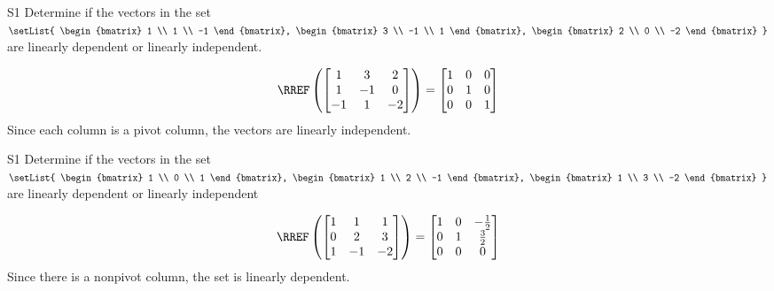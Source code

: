 \begin{problem}{S1}
Determine if the vectors in the set
\(\setList{
  \begin{bmatrix} 1 \\ 1 \\ -1 \end{bmatrix},
  \begin{bmatrix} 3 \\ -1 \\ 1 \end{bmatrix},
  \begin{bmatrix} 2 \\ 0 \\ -2 \end{bmatrix}
}\)
are linearly dependent or linearly independent.
\end{problem}
\begin{solution}
\[
  \RREF\left(
    \begin{bmatrix} 1 & 3 & 2 \\ 1 & -1 & 0 \\ -1 & 1 & -2 \end{bmatrix}
  \right)
    =
  \begin{bmatrix} 1 & 0 &0 \\ 0 & 1 & 0 \\ 0 & 0 & 1\end{bmatrix}
\]
Since each column is a pivot column, the vectors are linearly independent.
\end{solution}


\begin{problem}{S1}
Determine if the vectors in the set
\(
  \setList{
    \begin{bmatrix} 1 \\ 0 \\ 1 \end{bmatrix},
    \begin{bmatrix} 1 \\ 2 \\ -1 \end{bmatrix},
    \begin{bmatrix} 1 \\ 3 \\ -2 \end{bmatrix}
  }
\)
are linearly dependent or linearly independent
\end{problem}
\begin{solution}
\[
  \RREF\left(
    \begin{bmatrix} 1 &  1 & 1 \\ 0  & 2 & 3 \\ 1  & -1 & -2 \end{bmatrix}
  \right)
    =
  \begin{bmatrix} 1 &  0 & -\frac{1}{2} \\ 0  & 1 & \frac{3}{2} \\ 0& 0 & 0  \end{bmatrix}
\]
Since there is a nonpivot column, the set is linearly dependent.
\end{solution}


